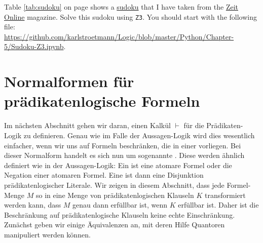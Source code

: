 \exerciseEng
{}
Table \ref{tab:sudoku} on page \pageref{tab:sudoku} shows a \href{https://en.wikipedia.org/wiki/Sudoku}{sudoku}
that I have taken from the
\href{http://sudoku.zeit.de/cgi-bin/sudoku/sudoku_kd_app_2016.pl?action=level&kd_nr=24091123601092&year=2018&month=03&day=23&level=-c+5}{Zeit Online}
magazine.
Solve this sudoku using \texttt{Z3}.  You should start with the following file:
\\[0.2cm]
\hspace*{0.0cm}
\href{https://github.com/karlstroetmann/Logic/blob/master/Python/Chapter-5/Sudoku-Z3.ipynb}{https://github.com/karlstroetmann/Logic/blob/master/Python/Chapter-5/Sudoku-Z3.ipynb}.
    \eox

\section{Normalformen für prädikatenlogische Formeln}
Im nächsten Abschnitt gehen wir daran, einen Kalkül $\vdash$ für die
Prädikaten-Logik zu definieren.  Genau wie im Falle der Aussagen-Logik wird dies wesentlich einfacher, wenn wir
uns auf Formeln beschränken, die in einer   vorliegen.  Bei dieser Normalform handelt es sich
nun um sogenannte .  Diese werden ähnlich
definiert wie in der 
Aussagen-Logik:  Ein  ist eine atomare
Formel oder die Negation einer 
atomaren Formel.  Eine  ist dann eine
Disjunktion prädikatenlogischer Literale.  Wir zeigen in diesem Abschnitt, dass jede Formel-Menge $M$
so in eine Menge von prädikatenlogischen Klauseln $K$ transformiert werden kann, dass $M$ genau dann erfüllbar ist, wenn $K$
erfüllbar ist.  Daher ist die Beschränkung auf prädikatenlogische Klauseln keine echte Einschränkung.  Zunächst geben wir einige
Äquivalenzen an, mit deren Hilfe Quantoren manipuliert werden können. 

